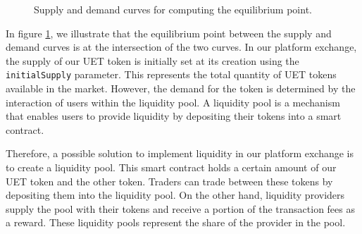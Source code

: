 \begin{figure}[ht]
    \centering

    \caption{Supply and demand curves for computing the equilibrium point.}
    \label{fig:liquidity}
\end{figure}

In figure \ref{fig:liquidity}, we illustrate that the equilibrium point between the supply and demand curves
is at the intersection of the two curves. In our platform exchange, the supply of our UET token is initially set
at its creation using the \texttt{initialSupply} parameter. This represents the total quantity of UET tokens available in the market.
However, the demand for the token is determined by the interaction of users within the liquidity pool. A liquidity pool is a
mechanism that enables users to provide liquidity by depositing their tokens into a smart contract.


Therefore, a possible solution to implement liquidity in our platform exchange is to create a liquidity pool. This smart contract holds a certain amount of our UET token and the other token. Traders can trade between these tokens
by depositing them into the liquidity pool. On the other hand, liquidity providers supply the pool with their tokens
and receive a portion of the transaction fees as a reward. These liquidity pools represent the share of the provider in
the pool.


